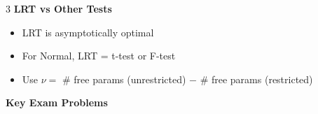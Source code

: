 \documentclass[10pt,letterpaper]{article}
\begin{document}
\begin{multicols}{3}
\textbf{LRT vs Other Tests}

\begin{itemize}
\item LRT is asymptotically optimal
\item For Normal, LRT = t-test or F-test
\item Use $\nu =$ \# free params (unrestricted) $-$ \# free params (restricted)
\end{itemize}


\end{multicols}

\setlength{\multicolsep}{1pt}
\setlength{\columnsep}{2pt}

\begin{center}
\Large{\textbf{Key Exam Problems}}
\end{center}
\end{document}
